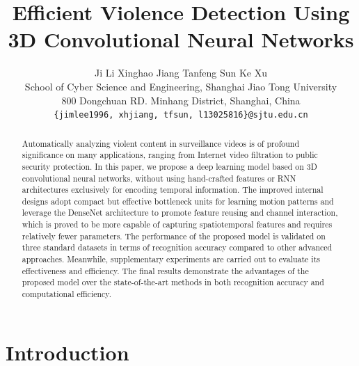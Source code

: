 \documentclass[10pt,twocolumn,letterpaper]{article}
\begin{document}
\title{Efficient Violence Detection Using 3D Convolutional Neural Networks}

\author{Ji Li \quad  Xinghao Jiang \quad  Tanfeng Sun \quad  Ke Xu\\
School of Cyber Science and Engineering, Shanghai Jiao Tong University\\
800 Dongchuan RD. Minhang District, Shanghai, China\\
{\tt\small \{jimlee1996, xhjiang, tfsun, l13025816\}@sjtu.edu.cn}
}

\maketitle

\begin{abstract}
Automatically analyzing violent content in surveillance videos is of profound significance on many applications, ranging from Internet video filtration to public security protection. In this paper, we propose a deep learning model based on 3D convolutional neural networks, without using hand-crafted features or RNN architectures exclusively for encoding temporal information. The improved internal designs adopt compact but effective bottleneck units for learning motion patterns and leverage the DenseNet architecture to promote feature reusing and channel interaction, which is proved to be more capable of capturing spatiotemporal features and requires relatively fewer parameters. The performance of the proposed model is validated on three standard datasets in terms of recognition accuracy compared to other advanced approaches. Meanwhile, supplementary experiments are carried out to evaluate its effectiveness and efficiency. The final results demonstrate the advantages of the proposed model over the state-of-the-art methods in both recognition accuracy and computational efficiency.
\end{abstract}

\section{Introduction}
\label{sec:1}
\end{document}
